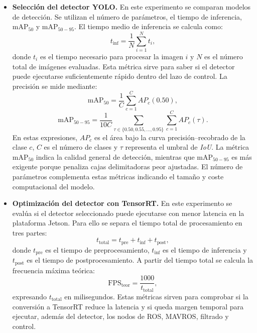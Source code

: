 \begin{itemize}
    

    \item \textbf{Selección del detector YOLO.} En este experimento se comparan modelos de detección. Se utilizan el número de parámetros, el tiempo de inferencia, $\mathrm{mAP}_{50}$ y $\mathrm{mAP}_{50-95}$. El tiempo medio de inferencia se calcula como:
    \[
    t_{\mathrm{inf}}=\frac{1}{N}\sum_{i=1}^{N}t_i,
    \]
    donde $t_i$ es el tiempo necesario para procesar la imagen $i$ y $N$ es el número total de imágenes evaluadas. Esta métrica sirve para saber si el detector puede ejecutarse suficientemente rápido dentro del lazo de control. La precisión se mide mediante:
    \[
    \mathrm{mAP}_{50}=\frac{1}{C}\sum_{c=1}^{C}AP_c(0.50),
    \]
    \[
    \mathrm{mAP}_{50-95}=\frac{1}{10C}\sum_{\tau\in\{0.50,0.55,\ldots,0.95\}}\sum_{c=1}^{C}AP_c(\tau).
    \]
    En estas expresiones, $AP_c$ es el área bajo la curva precisión--recobrado de la clase $c$, $C$ es el número de clases y $\tau$ representa el umbral de \textit{IoU}. La métrica $\mathrm{mAP}_{50}$ indica la calidad general de detección, mientras que $\mathrm{mAP}_{50-95}$ es más exigente porque penaliza cajas delimitadoras peor ajustadas. El número de parámetros complementa estas métricas indicando el tamaño y coste computacional del modelo.

    \item \textbf{Optimización del detector con TensorRT.} En este experimento se evalúa si el detector seleccionado puede ejecutarse con menor latencia en la plataforma Jetson. Para ello se separa el tiempo total de procesamiento en tres partes:
    \[
    t_{\mathrm{total}}=t_{\mathrm{pre}}+t_{\mathrm{inf}}+t_{\mathrm{post}},
    \]
    donde $t_{\mathrm{pre}}$ es el tiempo de preprocesamiento, $t_{\mathrm{inf}}$ es el tiempo de inferencia y $t_{\mathrm{post}}$ es el tiempo de postprocesamiento. A partir del tiempo total se calcula la frecuencia máxima teórica:
    \[
    \mathrm{FPS}_{\mathrm{teor}}=\frac{1000}{t_{\mathrm{total}}},
    \]
    expresando $t_{\mathrm{total}}$ en milisegundos. Estas métricas sirven para comprobar si la conversión a TensorRT reduce la latencia y si queda margen temporal para ejecutar, además del detector, los nodos de ROS, MAVROS, filtrado y control.


\end{itemize}

